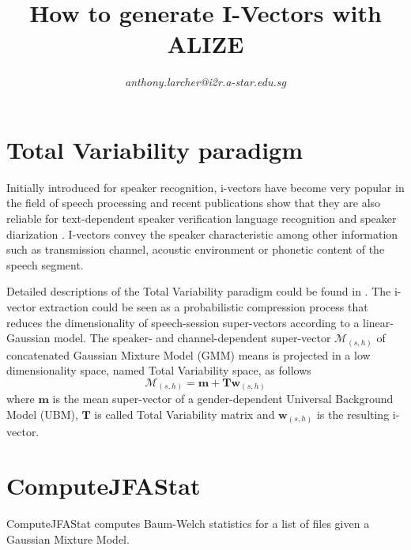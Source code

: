 

\title{How to generate I-Vectors with ALIZE}
\author{\small \textit{anthony.larcher@i2r.a-star.edu.sg}}



\maketitle

\tableofcontents

\postheader

\newpage
\section{Total Variability paradigm}
Initially introduced for speaker recognition, i-vectors \cite{Dehak11_a} have become very popular in the field of speech processing and recent publications show that they are also reliable for text-dependent speaker verification \cite{Larcher12_a} language recognition \cite{Martinez11} and speaker diarization \cite{Franco10}.
%
I-vectors convey the speaker characteristic among other information such as transmission channel, acoustic environment or phonetic content of the speech segment.

Detailed descriptions of the Total Variability paradigm could be found in \cite{Dehak11_a,Martinez11,Kanagasundaram11}. The i-vector extraction could be seen as a probabilistic compression process that reduces the dimensionality of speech-session super-vectors according to a linear-Gaussian model. The speaker- and channel-dependent super-vector $\mathcal{M}_{(s,h)}$ of concatenated Gaussian Mixture Model (GMM) means is projected in a low dimensionality space, named Total Variability space, as follows
%
\begin{equation}
\mathcal{M}_{(s,h)}=\textbf{m}+\textbf{T}\textbf{w}_{(s,h)}
\label{I_Vector_modelling}
\end{equation}
%
where $\textbf{m}$ is the mean super-vector of a gender-dependent Universal Background Model (UBM), $\textbf{T}$ is called Total Variability matrix and $\textbf{w}_{(s,h)}$ is the resulting i-vector.

\newpage
\section{ComputeJFAStat}
%
ComputeJFAStat computes Baum-Welch statistics for a list of files given a Gaussian Mixture Model.

